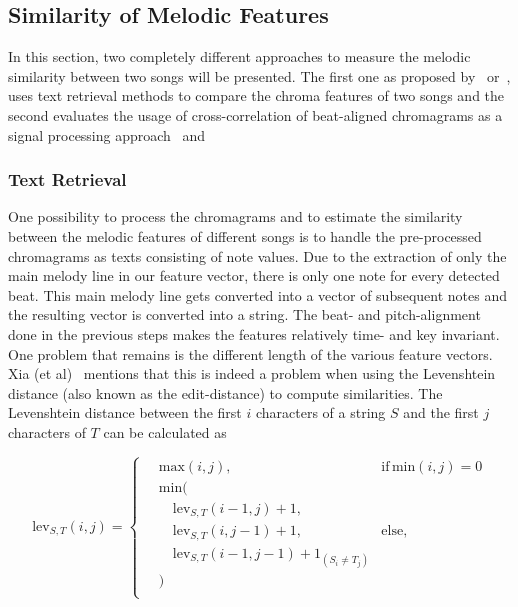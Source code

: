 \subsection{Similarity of Melodic Features}

In this section, two completely different approaches to measure the melodic similarity between two songs will be presented. The first one as proposed by~\cite{chroma1} or~\cite{chroma4}, uses text retrieval methods to compare the chroma features of two songs and the second evaluates the usage of cross-correlation of beat-aligned chromagrams as a signal processing approach~\cite{chroma2} and~\cite{chroma3}

\subsubsection{Text Retrieval}\label{textretr}

One possibility to process the chromagrams and to estimate the similarity between the melodic features of different songs is to handle the pre-processed chromagrams as texts consisting of note values. Due to the extraction of only the main melody line in our feature vector, there is only one note for every detected beat. This main melody line gets converted into a vector of subsequent notes and the resulting vector is converted into a string. The beat- and pitch-alignment done in the previous steps makes the features relatively time- and key invariant. One problem that remains is the different length of the various feature vectors. Xia (et al)~\cite{chroma4} mentions that this is indeed a problem when using the Levenshtein distance (also known as the edit-distance) to compute similarities. The Levenshtein distance between the first $i$ characters of a string $S$ and the first $j$ characters of $T$ can be calculated as 

\begin{equation} \label{eq:tr1}
\text{lev}_{S,T}(i, j) = \begin{cases}
\quad\text{max}(i, j), & \text{if} \, \text{min}(i, j) = 0\\
\quad\text{min}(\\
	\quad\quad\text{lev}_{S,T}(i-1, j) + 1,\\ 
	\quad\quad\text{lev}_{S,T}(i, j-1) + 1,	& \text{else},\\
	\quad\quad\text{lev}_{S,T}(i-1, j-1) + 1_{(S_i \neq T_j)}\\
	\quad)\\ 
	\end{cases}
\end{equation}

